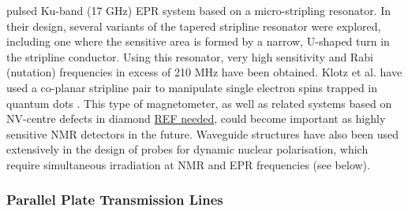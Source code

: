 pulsed Ku-band (17 GHz) EPR system based on a micro-stripling resonator.
In their design, several variants of the tapered stripline resonator
were explored, including one where the sensitive area is formed by a
narrow, U-shaped turn in the stripline conductor. Using this resonator,
very high sensitivity and Rabi (nutation) frequencies in excess of 210
MHz have been obtained. Klotz et al. have used a co-planar stripline
pair to manipulate single electron spins trapped in quantum dots
\cite{Klotz:2011gf}. This type of magnetometer, as well as related systems
based on NV-centre defects in diamond \href{}{REF needed}, could become
important as highly sensitive NMR detectors in the future. Waveguide
structures have also been used extensively in the design of probes for
dynamic nuclear polarisation, which require simultaneous irradiation at
NMR and EPR frequencies (see below).

\subsubsection{Parallel Plate Transmission
Lines}\label{parallel-plate-transmission-lines}

